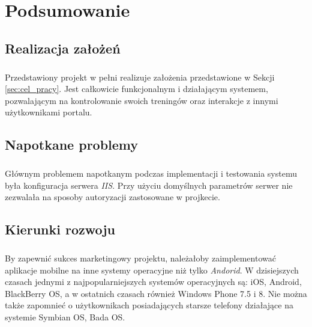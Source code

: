 \chapter{Podsumowanie} %
\label{cha:podsumowanie}

\section{Realizacja założeń} %
\label{sec:realizacja_za_o_e_}
\paragraph{} %
\label{par:}

Przedstawiony projekt w pełni realizuje założenia przedstawione w Sekcji \ref{sec:cel_pracy}. Jest całkowicie funkcjonalnym i działającym systemem, pozwalającym na kontrolowanie swoich treningów oraz interakcje z innymi użytkownikami portalu.

\section{Napotkane problemy} %
\label{sec:napotkane_problemy}
\paragraph{} %
\label{par:}
Głównym problemem napotkanym podczas implementacji i testowania systemu była konfiguracja serwera \textit{IIS}. Przy użyciu domyślnych parametrów serwer nie zezwalała na sposoby autoryzacji zastosowane w projkecie.


\section{Kierunki rozwoju} %
\label{sec:kierunki_rozwoju}

\paragraph{} %
\label{par:}
By zapewnić sukces marketingowy projektu, należałoby zaimplementować aplikacje mobilne na inne systemy operacyjne niż tylko \textit{Andorid}. W dzisiejszych czasach jednymi z najpopularniejszych systemów operacyjnych są: iOS, Android, BlackBerry OS, a w ostatnich czasach również Windows Phone 7.5 i 8. Nie można także zapomnieć o użytkownikach posiadających starsze telefony działające na systemie Symbian OS, Bada OS.


